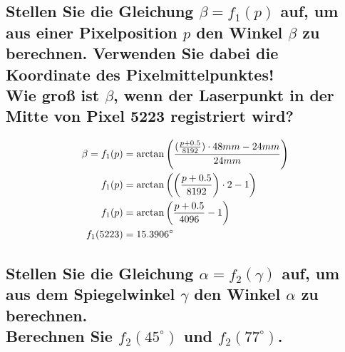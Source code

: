 \documentclass[a4paper,10pt,DIV=14]{scrartcl}
\newcommand{\dg}[1]{#1^\circ}
\begin{document}
\subsection{Stellen Sie die Gleichung $\beta = f_1(p)$ auf, um aus einer Pixelposition $p$ den Winkel $\beta$ zu berechnen. Verwenden Sie dabei die Koordinate des Pixelmittelpunktes! \\ Wie groß ist $\beta$, wenn der Laserpunkt in der Mitte von Pixel 5223 registriert wird?}
%
%
%
\begin{align*}
\beta = f_1(p) &= \arctan \left( \frac{(\frac{p+0.5}{8192}) \cdot 48mm - 24mm}{24 mm} \right) \\
f_1(p) &= \arctan \left(\left(\frac{p+0.5}{8192}\right) \cdot 2 - 1 \right) \\
f_1(p) &= \arctan \left(\frac{p+0.5}{4096} - 1 \right) \\
f_1(5223) &=  15.3906 \degree
\end{align*}

\subsection{Stellen Sie die Gleichung $\alpha = f_2(\gamma)$ auf, um aus dem Spiegelwinkel $\gamma$ den Winkel $\alpha$ zu berechnen. \\ Berechnen Sie $f_2(45^\circ)$ und $f_2(77^\circ)$.}
\end{document}
